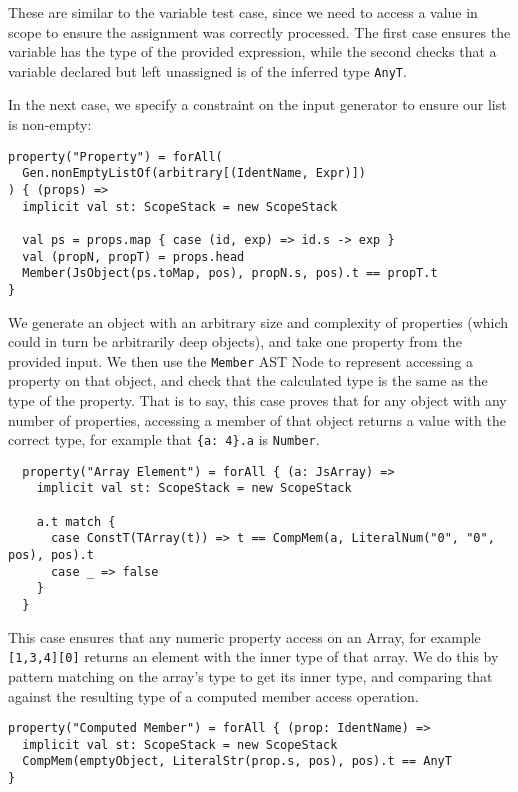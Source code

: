 \documentclass[british, twoside]{bhamthesis}
\theoremstyle{definition}
\begin{document}
      These are similar to the variable test case, since we need to access a value in scope to ensure the assignment was correctly processed. The first case ensures the variable has the type of the provided expression, while the second checks that a variable declared but left unassigned is of the inferred type \texttt{AnyT}.

      In the next case, we specify a constraint on the input generator to ensure our list is non-empty:
      \begin{lstlisting}
property("Property") = forAll(
  Gen.nonEmptyListOf(arbitrary[(IdentName, Expr)])
) { (props) =>
  implicit val st: ScopeStack = new ScopeStack

  val ps = props.map { case (id, exp) => id.s -> exp }
  val (propN, propT) = props.head
  Member(JsObject(ps.toMap, pos), propN.s, pos).t == propT.t
}
      \end{lstlisting}

      We generate an object with an arbitrary size and complexity of properties (which could in turn be arbitrarily deep objects), and take one property from the provided input. We then use the \texttt{Member} AST Node to represent accessing a property on that object, and check that the calculated type is the same as the type of the property. That is to say, this case proves that for any object with any number of properties, accessing a member of that object returns a value with the correct type, for example that \texttt{\{a: 4\}.a} is \texttt{Number}.


      \begin{lstlisting}
  property("Array Element") = forAll { (a: JsArray) =>
    implicit val st: ScopeStack = new ScopeStack

    a.t match {
      case ConstT(TArray(t)) => t == CompMem(a, LiteralNum("0", "0", pos), pos).t
      case _ => false
    }
  }
      \end{lstlisting}

      This case ensures that any numeric property access on an Array, for example \texttt{[1,3,4][0]} returns an element with the inner type of that array. We do this by pattern matching on the array's type to get its inner type, and comparing that against the resulting type of a computed member access operation.

      \begin{lstlisting}
property("Computed Member") = forAll { (prop: IdentName) =>
  implicit val st: ScopeStack = new ScopeStack
  CompMem(emptyObject, LiteralStr(prop.s, pos), pos).t == AnyT
}
      \end{lstlisting}
\end{document}
